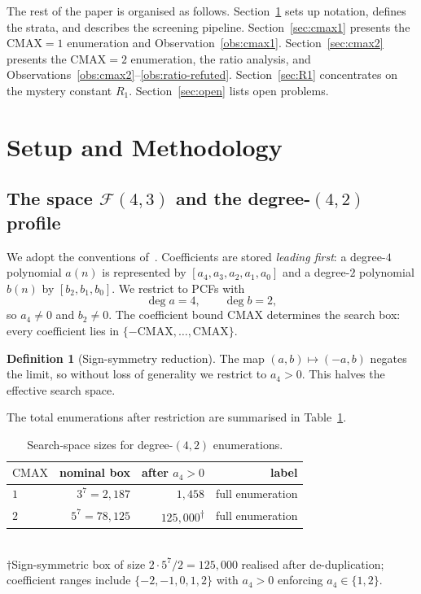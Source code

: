 \documentclass[11pt,a4paper]{amsart}
\theoremstyle{definition}
\newtheorem{definition}[theorem]{Definition}
\theoremstyle{remark}
\newcommand{\FF}{\mathcal{F}}
\begin{document}
The rest of the paper is organised as follows.  Section~\ref{sec:methods}
sets up notation, defines the strata, and describes the screening
pipeline.  Section~\ref{sec:cmax1} presents the $\mathrm{CMAX}=1$
enumeration and Observation~\ref{obs:cmax1}.  Section~\ref{sec:cmax2}
presents the $\mathrm{CMAX}=2$ enumeration, the ratio analysis, and
Observations~\ref{obs:cmax2}--\ref{obs:ratio-refuted}.
Section~\ref{sec:R1} concentrates on the mystery constant $R_1$.
Section~\ref{sec:open} lists open problems.

\section{Setup and Methodology}\label{sec:methods}

\subsection{The space $\FF(4,3)$ and the degree-$(4,2)$ profile}

We adopt the conventions of~\cite{PCF24}.  Coefficients are stored
\emph{leading first}: a degree-$4$ polynomial $a(n)$ is represented by
$[a_4,a_3,a_2,a_1,a_0]$ and a degree-$2$ polynomial $b(n)$ by
$[b_2,b_1,b_0]$.  We restrict to PCFs with
\[
  \deg a = 4, \qquad \deg b = 2,
\]
so $a_4 \neq 0$ and $b_2 \neq 0$.  The coefficient bound $\mathrm{CMAX}$
determines the search box: every coefficient lies in
$\{-\mathrm{CMAX},\dotsc,\mathrm{CMAX}\}$.

\begin{definition}[Sign-symmetry reduction]
The map $(a,b) \mapsto (-a, b)$ negates the limit, so without loss of
generality we restrict to $a_4 > 0$.  This halves the effective search
space.
\end{definition}

The total enumerations after restriction are summarised in
Table~\ref{tab:enum-sizes}.

\begin{table}[h]
\centering
\caption{Search-space sizes for degree-$(4,2)$ enumerations.}
\label{tab:enum-sizes}
\begin{tabular}{lrrr}
\toprule
$\mathrm{CMAX}$ & nominal box & after $a_4>0$ & label \\
\midrule
$1$ & $3^7 = 2{,}187$ & $1{,}458$  & full enumeration \\
$2$ & $5^7 = 78{,}125$ & $125{,}000$\textsuperscript{$\dagger$} & full enumeration \\
\bottomrule
\end{tabular}
\\[2pt]
{\footnotesize $\dagger$Sign-symmetric box of size $2 \cdot 5^7 / 2 = 125{,}000$
realised after de-duplication; coefficient ranges include $\{-2,-1,0,1,2\}$
with $a_4>0$ enforcing $a_4 \in \{1,2\}$.}
\end{table}
\end{document}
